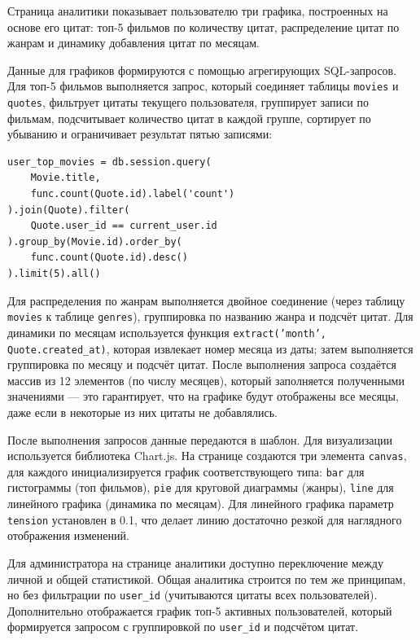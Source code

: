 Страница аналитики показывает пользователю три графика, построенных на основе его цитат: 
топ-5 фильмов по количеству цитат, распределение цитат по жанрам и динамику добавления цитат 
по месяцам.

Данные для графиков формируются с помощью агрегирующих SQL-запросов. Для топ-5 фильмов 
выполняется запрос, который соединяет таблицы \texttt{movies} и \texttt{quotes}, фильтрует 
цитаты текущего пользователя, группирует записи по фильмам, подсчитывает количество цитат 
в каждой группе, сортирует по убыванию и ограничивает результат пятью записями:

\newpage
\begin{lstlisting}[caption={SQLAlchemy-запрос для топ-5 фильмов пользователя}, label={lst:top_movies}]
user_top_movies = db.session.query(
    Movie.title,
    func.count(Quote.id).label('count')
).join(Quote).filter(
    Quote.user_id == current_user.id
).group_by(Movie.id).order_by(
    func.count(Quote.id).desc()
).limit(5).all()
\end{lstlisting}

Для распределения по жанрам выполняется двойное соединение (через таблицу \texttt{movies} к 
таблице \texttt{genres}), группировка по названию жанра и подсчёт цитат. Для динамики по 
месяцам используется функция \texttt{extract('month', Quote.created\_at)}, которая извлекает 
номер месяца из даты; затем выполняется группировка по месяцу и подсчёт цитат. После 
выполнения запроса создаётся массив из 12 элементов (по числу месяцев), который заполняется 
полученными значениями — это гарантирует, что на графике будут отображены все месяцы, даже 
если в некоторые из них цитаты не добавлялись.

После выполнения запросов данные передаются в шаблон. Для визуализации используется 
библиотека Chart.js. На странице создаются три элемента \texttt{canvas}, для каждого 
инициализируется график соответствующего типа: \texttt{bar} для гистограммы (топ фильмов), 
\texttt{pie} для круговой диаграммы (жанры), \texttt{line} для линейного графика (динамика 
по месяцам). Для линейного графика параметр \texttt{tension} установлен в 0.1, что делает 
линию достаточно резкой для наглядного отображения изменений.

Для администратора на странице аналитики доступно переключение между личной и общей 
статистикой. Общая аналитика строится по тем же принципам, но без фильтрации по 
\texttt{user\_id} (учитываются цитаты всех пользователей). Дополнительно отображается 
график топ-5 активных пользователей, который формируется запросом с группировкой по 
\texttt{user\_id} и подсчётом цитат.

